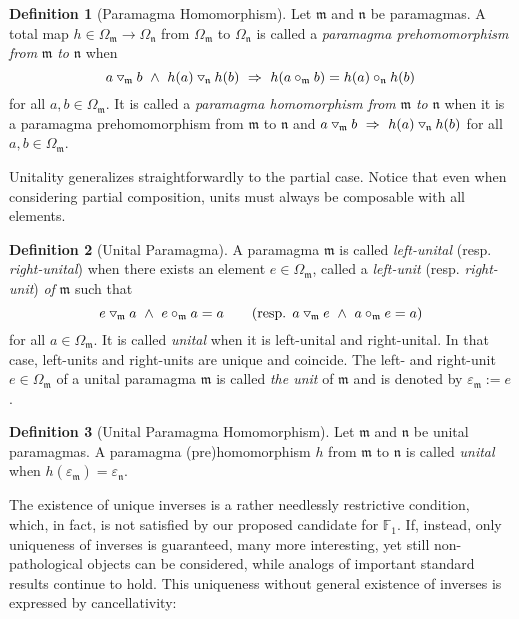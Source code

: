 \documentclass{article}
\theoremstyle{definition}
\newtheorem{definition}{Definition}[section]
\newcommand{\impl}{~\Rightarrow~}
\newcommand{\conj}{~\land~}
\newcommand{\tridown}{\mathbin{\hspace{.1em}\raisebox{.02em}{\rotatebox[origin=c]{90}{$\triangleleft$}}}}
\newcommand{\comp}{\tridown}
\newcommand{\eps}{\varepsilon}
\begin{document}
\begin{definition}[Paramagma Homomorphism]
Let \(\mathfrak{m}\) and \(\mathfrak{n}\) be paramagmas. A total map \(h\in\Omega_\mathfrak{m}\to\Omega_\mathfrak{n}\) from \(\Omega_\mathfrak{m}\) to \(\Omega_\mathfrak{n}\) is called a \textit{paramagma prehomomorphism from} \(\mathfrak{m}\) \textit{to} \(\mathfrak{n}\) when \[a\comp_\mathfrak{m}b\conj h(a)\comp_\mathfrak{n}h(b)\impl h(a\circ_\mathfrak{m}b)=h(a)\circ_\mathfrak{n}h(b)\] for all \(a,b\in\Omega_\mathfrak{m}\). It is called a \textit{paramagma homomorphism from} \(\mathfrak{m}\) \textit{to} \(\mathfrak{n}\) when it is a paramagma prehomomorphism from \(\mathfrak{m}\) to \(\mathfrak{n}\) and \(a\comp_\mathfrak{m}b\impl h(a)\comp_\mathfrak{n}h(b)\) for all \(a,b\in\Omega_\mathfrak{m}\).
\end{definition}

Unitality generalizes straightforwardly to the partial case. Notice that even when considering partial composition, units must always be composable with all elements.

\begin{definition}[Unital Paramagma]
A paramagma \(\mathfrak{m}\) is called \textit{left-unital} (resp. \textit{right-unital}) when there exists an element \(e\in\Omega_\mathfrak{m}\), called a \textit{left-unit} (resp. \textit{right-unit}) \textit{of} \(\mathfrak{m}\) such that \[e\comp_\mathfrak{m}a\conj e\circ_\mathfrak{m}a=a\qquad(\text{resp. }a\comp_\mathfrak{m}e\conj a\circ_\mathfrak{m}e=a)\] for all \(a\in\Omega_\mathfrak{m}\). It is called \textit{unital} when it is left-unital and right-unital. In that case, left-units and right-units are unique and coincide. The left- and right-unit \(e\in\Omega_\mathfrak{m}\) of a unital paramagma \(\mathfrak{m}\) is called \textit{the unit} of \(\mathfrak{m}\) and is denoted by \(\eps_\mathfrak{m}:=e\).
\end{definition}

\begin{definition}[Unital Paramagma Homomorphism]
Let \(\mathfrak{m}\) and \(\mathfrak{n}\) be unital paramagmas. A paramagma (pre)homomorphism \(h\) from \(\mathfrak{m}\) to \(\mathfrak{n}\) is called \textit{unital} when \(h(\eps_\mathfrak{m})=\eps_\mathfrak{n}\).
\end{definition}

The existence of unique inverses is a rather needlessly restrictive condition, which, in fact, is not satisfied by our proposed candidate for \(\mathbb{F}_1\). If, instead, only uniqueness of inverses is guaranteed, many more interesting, yet still non-pathological objects can be considered, while analogs of important standard results continue to hold. This uniqueness without general existence of inverses is expressed by cancellativity:
\end{document}
